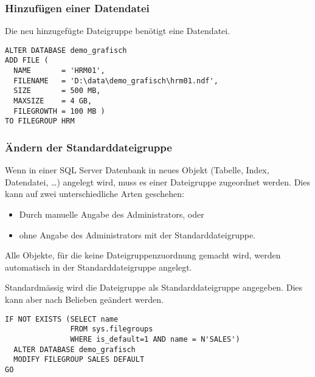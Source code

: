         \subsubsection{Hinzufügen einer Datendatei}
          Die neu hinzugefügte Dateigruppe  benötigt eine
          Datendatei.
          \begin{lstlisting}[language=ms_sql,caption={Eine
          Datendatei einer Dateigruppe hinzufügen},label=admin03_13]
ALTER DATABASE demo_grafisch
ADD FILE ( 
  NAME       = 'HRM01', 
  FILENAME   = 'D:\data\demo_grafisch\hrm01.ndf', 
  SIZE       = 500 MB, 
  MAXSIZE    = 4 GB, 
  FILEGROWTH = 100 MB ) 
TO FILEGROUP HRM
          \end{lstlisting}
          \begin{literaturinternet}
            \item \cite{bb522469}
          \end{literaturinternet}
        \subsubsection{Ändern der Standarddateigruppe}
          Wenn in einer SQL Server Datenbank in neues Objekt (Tabelle, Index,
          Datendatei, \ldots) angelegt wird, muss es einer Dateigruppe
          zugeordnet werden. Dies kann auf zwei unterschiedliche Arten
          geschehen:
          \begin{itemize}
              \item Durch manuelle Angabe des Administrators, oder
              \item ohne Angabe des Administrators mit der Standarddateigruppe.
          \end{itemize}
          \begin{merke}
            Alle Objekte, f\"ur die keine Dateigruppenzuordnung gemacht wird,
            werden automatisch in der Standarddateigruppe angelegt.
          \end{merke}
          Standardmässig wird die Dateigruppe  als
          Standarddateigruppe angegeben. Dies kann aber nach Belieben geändert
          werden.
\clearpage
          \begin{lstlisting}[language=ms_sql,caption={Ändern
          der Standarddateigruppe},label=admin03_14]
IF NOT EXISTS (SELECT name 
               FROM sys.filegroups 
               WHERE is_default=1 AND name = N'SALES')
  ALTER DATABASE demo_grafisch
  MODIFY FILEGROUP SALES DEFAULT
GO
          \end{lstlisting}
